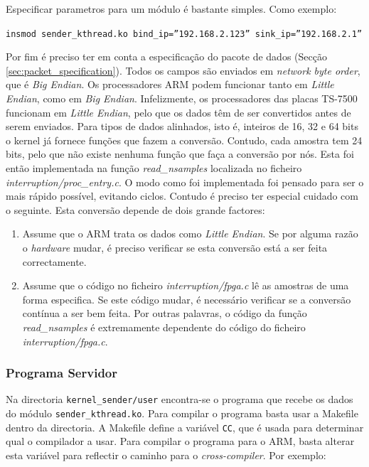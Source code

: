 \documentclass[10pt,a4paper,oneside]{book}
\begin{document}
    Especificar parametros para um módulo é bastante simples. Como exemplo:

    \begin{flushleft}
      {\tt insmod sender\_kthread.ko bind\_ip=''192.168.2.123'' sink\_ip=''192.168.2.1''}
    \end{flushleft}

    Por fim é preciso ter em conta a especificação do pacote de dados (Secção \ref{sec:packet_specification}). Todos os campos são enviados em \emph{network byte order}, que é \emph{Big Endian}. Os processadores ARM podem funcionar tanto em \emph{Little Endian}, como em \emph{Big Endian}. Infelizmente, os processadores das placas TS-7500 funcionam em \emph{Little Endian}, pelo que os dados têm de ser convertidos antes de serem enviados. Para tipos de dados alinhados, isto é, inteiros de 16, 32 e 64 bits o kernel já fornece funções que fazem a conversão. Contudo, cada amostra tem 24 bits, pelo que não existe nenhuma função que faça a conversão por nós. Esta foi então implementada na função \emph{read\_nsamples} localizada no ficheiro \emph{interruption/proc\_entry.c}. O modo como foi implementada foi pensado para ser o mais rápido possível, evitando ciclos. Contudo é preciso ter especial cuidado com o seguinte. Esta conversão depende de dois grande factores:

    \begin{enumerate}
    \item Assume que o ARM trata os dados como \emph{Little Endian}. Se por alguma razão o \emph{hardware} mudar, é preciso verificar se esta conversão está a ser feita correctamente.
    \item Assume que o código no ficheiro \emph{interruption/fpga.c} lê as amostras de uma forma especifica. Se este código mudar, é necessário verificar se a conversão contínua a ser bem feita. Por outras palavras, o código da função \emph{read\_nsamples} é extremamente dependente do código do ficheiro \emph{interruption/fpga.c}.
    \end{enumerate}

    \subsubsection{Programa Servidor}
    
    Na directoria {\tt kernel\_sender/user} encontra-se o programa que recebe os dados do módulo {\tt sender\_kthread.ko}. Para compilar o programa basta usar a Makefile dentro da directoria. A Makefile define a variável {\tt CC}, que é usada para determinar qual o compilador a usar. Para compilar o programa para o ARM, basta alterar esta variável para reflectir o caminho para o \emph{cross-compiler}. Por exemplo:
\end{document}
